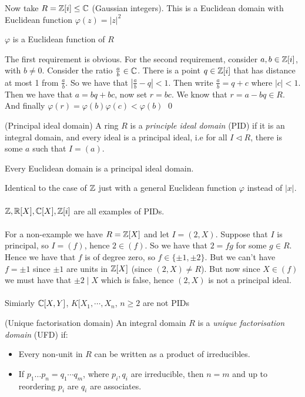 \documentclass{article}
\newcommand{\nrm}{\triangleleft}
\begin{document}
\begin{itemize}
Now take $ R=\mathbb{Z}[i]\le \mathbb{C} $ (Gaussian integers). This is a Euclidean domain with Euclidean function $ \varphi(z)=|z|^2 $
\begin{claim}
  $\varphi$ is a Euclidean function of $ R $
\end{claim} 
\pf The first requirement is obvious. For the second requirement, consider $ a,b\in\mathbb{Z}[i] $, with $ b\ne 0 $. Consider the ratio $ \frac ab\in \mathbb{C} $. There is a point $ q\in \mathbb{Z}[i] $ that has distance at most 1 from $ \frac ab $. So we have that $ \left|\frac ab - q\right|<1 $. Then write $ \frac ab = q+c $ where $ |c|<1 $. Then we have that $ a=bq+bc $, now set $ r=bc $. We know that $ r=a-bq\in R $. And finally $ \varphi(r)=\varphi(b)\varphi(c)<\varphi(b) $ \qed

\begin{definition}
	(Principal ideal domain) A ring $ R $ is a \textit{principle ideal domain} (PID) if it is an integral domain, and every ideal is a principal ideal, i.e for all $ I\nrm R $, there is some $ a $ such that $ I=(a) $.
\end{definition}
\begin{proposition}
  Every Euclidean domain is a principal ideal domain.
\end{proposition}
\pf Identical to the case of $ \mathbb{Z} $ just with a general Euclidean function $ \varphi $ instead of $ |x| $.
\\\\
$\mathbb{Z}, \mathbb{R}[X], \mathbb{C}[X], \mathbb{Z}[i] $ are all examples of PIDs.
\\\\
For a non-example we have $ R=\mathbb{Z}[X] $ and let $ I= (2, X) $. Suppose that $ I $ is principal, so $ I=(f) $, hence $ 2\in (f) $. So we have that $ 2=fg $ for some $ g\in R $. Hence we have that $ f $ is of degree zero, so $ f\in \{\pm 1, \pm 2\} $. But we can't have $ f=\pm 1 $ since $ \pm 1 $ are units in $ \mathbb{Z}[X] $ (since $ (2,X)\ne R $). But now since $ X\in (f) $ we must have that $ \pm 2\mid X $ which is false, hence $ (2,X) $ is not a principal ideal.\\\\
Simiarly $ \mathbb{C}[X,Y] $, $ K[X_1,\cdots, X_n $, $ n\ge 2 $ are not PIDs
\begin{definition}
	(Unique factorisation domain) An integral domain $ R $ is a \textit{unique factorisation domain} (UFD) if:
	\begin{itemize}
		\item Every non-unit in $ R $ can be written as a product of irreducibles.
		\item If $ p_1\dots p_n=q_1\cdots q_m $, where $ p_i, q_i $ are irreducible, then $ n=m $ and up to reordering $ p_i $ are $ q_i $ are associates.

\end{itemize}
\end{definition}
\end{itemize}
\end{document}
